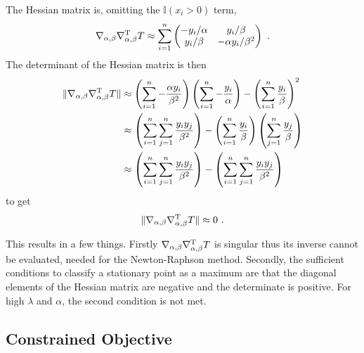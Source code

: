 The Hessian matrix is, omitting the $\mathbb{I}(x_i>0)$ term,
\begin{equation}
  \nabla_{\alpha,\beta}\nabla_{\alpha,\beta}^\textup{T} T \approx
  \sum_{i=1}^n
  \begin{pmatrix}
    -y_i/\alpha  & y_i/\beta \\
    y_i/\beta & -\alpha y_i/\beta^2
  \end{pmatrix}
  \ . 
\end{equation}
The determinant of the Hessian matrix is then
\begin{align*}
  \|\nabla_{\alpha,\beta}\nabla_{\alpha,\beta}^\textup{T} T\|
  &\approx
  \left(\sum_{i=1}^n-\frac{\alpha y_i}{\beta^2}\right)
  \left(\sum_{i=1}^n-\frac{y_i}{\alpha}\right) - \left(\sum_{i=1}^n\frac{y_i}{\beta}\right)^2
  \\
  &\approx
  \left(\sum_{i=1}^n\sum_{j=1}^n\frac{y_iy_j}{\beta^2}\right)
   - \left(\sum_{i=1}^n\frac{y_i}{\beta}\right)\left(\sum_{j=1}^n\frac{y_j}{\beta}\right)
  \\
  &\approx
  \left(\sum_{i=1}^n\sum_{j=1}^n\frac{y_iy_j}{\beta^2}\right)
   - \left(\sum_{i=1}^n\sum_{j=1}^n\frac{y_iy_j}{\beta^2}\right)
\end{align*}
to get
\begin{equation}
  \|\nabla_{\alpha,\beta}\nabla_{\alpha,\beta}^\textup{T} T\|
  \approx
  0
  \ .
\end{equation}

This results in a few things. Firstly $\nabla_{\alpha,\beta}\nabla_{\alpha,\beta}^\textup{T} T$ is singular thus its inverse cannot be evaluated, needed for the Newton-Raphson method. Secondly, the sufficient conditions to classify a stationary point as a maximum are that the diagonal elements of the Hessian matrix are negative and the determinate is positive. For high $\lambda$ and $\alpha$, the second condition is not met.

\subsection{Constrained Objective}


